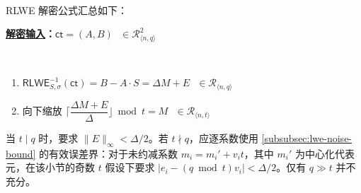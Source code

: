 $ $

RLWE 解密公式汇总如下：


\begin{tcolorbox}[title={\textbf{\tboxlabel{\ref*{subsec:rlwe-dec}} RLWE 解密}}]

\textbf{\underline{解密输入}：}$\textsf{ct} = (A, B) \text{ } \in \mathcal{R}_{\langle n, q \rangle}^{2}$

$ $

\begin{enumerate}

\item $\textsf{RLWE}^{-1}_{S,\sigma}(\textsf{ct}) = B - A \cdot S = \Delta  M + E \text{ } \in \mathcal{R}_{\langle n,q \rangle}$ 
\item 向下缩放 $\Bigg\lceil\dfrac{ \Delta M + E}{\Delta}\Bigg\rfloor \bmod t = M \text{ } \in \mathcal{R}_{\langle n,t \rangle}$

\end{enumerate}

当 $t\mid q$ 时，要求 $\|E\|_\infty<\Delta/2$。若 $t\nmid q$，应逐系数使用 \autoref{subsubsec:lwe-noise-bound} 的有效误差界：对于未约减系数 $m_i=m_i'+v_it$，其中 $m_i'$ 为中心化代表元，在该小节的奇数 $t$ 假设下要求 $|e_i-(q\bmod t)v_i|<\Delta/2$。仅有 $q\gg t$ 并不充分。

\end{tcolorbox}